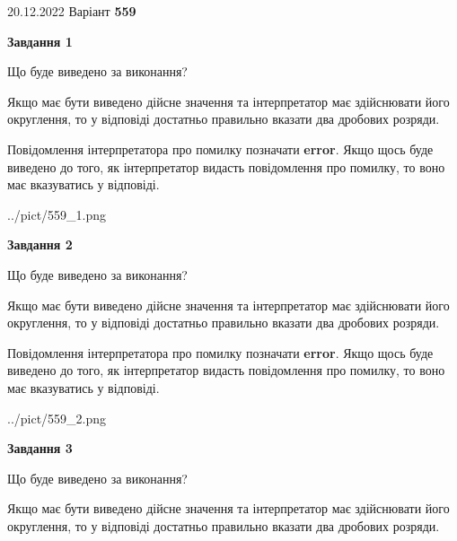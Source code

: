 \documentclass[12pt, ukrainian]{article}
\begin{document}
{20.12.2022 Варіант \No \textbf { 559 }\par}
{
\begin {Large}

{\begin {center}\textbf{Завдання 1}\end {center}}\par
Що буде виведено за виконання? \par

Якщо має бути виведено дійсне значення та інтерпретатор має здійснювати його округлення, 
то у відповіді достатньо правильно вказати два дробових розряди.

Повідомлення інтерпретатора про помилку позначати \textbf{error}.
Якщо щось буде виведено до того, як інтерпретатор видасть повідомлення про помилку, 
то воно має вказуватись у відповіді. \par

\begin{center}
	{../pict/559_1.png}
\end{center}
\newpage

{\begin {center}\textbf{Завдання 2}\end {center}}\par
Що буде виведено за виконання? \par

Якщо має бути виведено дійсне значення та інтерпретатор має здійснювати його округлення, 
то у відповіді достатньо правильно вказати два дробових розряди.

Повідомлення інтерпретатора про помилку позначати \textbf{error}.
Якщо щось буде виведено до того, як інтерпретатор видасть повідомлення про помилку, 
то воно має вказуватись у відповіді. \par

\begin{center}
	{../pict/559_2.png}
\end{center}
\newpage

{\begin {center}\textbf{Завдання 3}\end {center}}\par
Що буде виведено за виконання? \par

Якщо має бути виведено дійсне значення та інтерпретатор має здійснювати його округлення, 
то у відповіді достатньо правильно вказати два дробових розряди.


\end{Large}}
\end{document}
